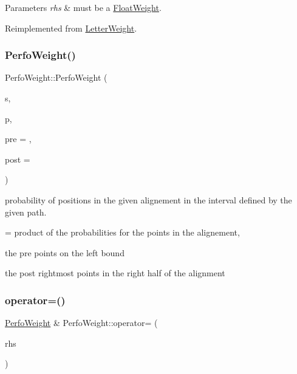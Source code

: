 \begin{DoxyParams}{Parameters}
{\em rhs} & must be a \mbox{\hyperlink{classFloatWeight}{Float\+Weight}}. \\
\hline
\end{DoxyParams}


Reimplemented from \mbox{\hyperlink{group__weight_gad1208e74e54ca8fc2f361e6fc106df01}{Letter\+Weight}}.

\mbox{\label{group__weight_gaa4edfc478ea676a169bd5b58b82ff352}} 
\subsubsection{\texorpdfstring{PerfoWeight()}{PerfoWeight()}}
{\footnotesize\ttfamily Perfo\+Weight\+::\+Perfo\+Weight (\begin{DoxyParamCaption}\item[{const \mbox{\hyperlink{classInputSegment}{Input\+Segment}} $\ast$}]{s,  }\item[{const \mbox{\hyperlink{classAlignedInterval}{Aligned\+Interval}} $\ast$}]{p,  }\item[{\mbox{\hyperlink{group__general_ga092fe8b972dfa977c2a0886720a7731e}{pre\+\_\+t}}}]{pre = {},  }\item[{\mbox{\hyperlink{group__general_ga092fe8b972dfa977c2a0886720a7731e}{pre\+\_\+t}}}]{post = {} }\end{DoxyParamCaption})}



probability of positions in the given alignement in the interval defined by the given path. 

= product of the probabilities for the points in the alignement,
\begin{DoxyItemize}
\item the pre points on the left bound
\item the post rightmost points in the right half of the alignment 
\end{DoxyItemize}\mbox{\label{group__weight_gaabb75d1419be3bb59dcdd3b8e56b0e63}} 
\subsubsection{\texorpdfstring{operator=()}{operator=()}\hspace{0.1cm}{\footnotesize\ttfamily [2/4]}}
{\footnotesize\ttfamily \mbox{\hyperlink{classPerfoWeight}{Perfo\+Weight}} \& Perfo\+Weight\+::operator= (\begin{DoxyParamCaption}\item[{const \mbox{\hyperlink{classLetterWeight}{Letter\+Weight}} \&}]{rhs }\end{DoxyParamCaption})}


